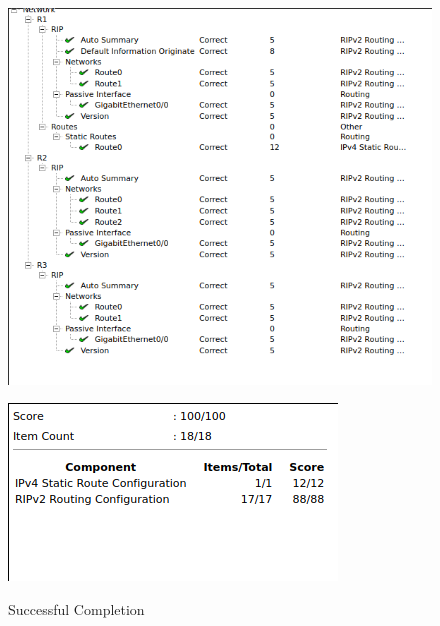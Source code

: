 \documentclass[../EngineeringJournal_CDavis.tex]{subfiles}
\begin{document}
\begin{figure}[!hbt]
  \begin{minipage}[c]{0.4\linewidth}
    \centering
      \includegraphics[scale=0.35]{Figures/2020-01-31-033357_601x534_scrot.png}
      \label{success7result1}
  \end{minipage}\hfill
  \begin{minipage}[c]{0.4\linewidth}
    \centering
    \includegraphics[scale=0.48]{Figures/2020-01-31-033406_330x178_scrot.png}
    \label{success7result2}
  \end{minipage}
  \caption{Successful Completion}\label{success7}
\end{figure}
\end{document}
